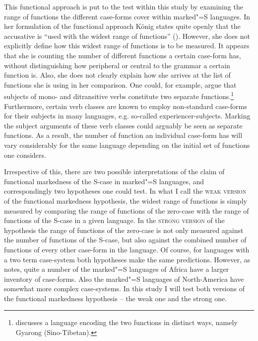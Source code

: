 This functional approach is put to the test within this study by examining the range of functions the different case-forms cover within marked"=S languages. 
In her formulation of the functional approach K\"onig states quite openly that the accusative is ``used with the widest range of functions'' (\citeyear[138]{Koenig:2008}). 
However, she does not explicitly define how this widest range of functions is to be measured. 
It appears that she is counting the number of different functions a certain case-form has, without distinguishing how peripheral or central to the grammar a certain function is. 
Also, she does not clearly explain how she arrives at the list of functions she is using in her comparison.  
One could, for example, argue that subjects of mono- and ditransitive verbs constitute two separate functions.\footnote{\citet[403]{Bickel.align} discusses a language encoding the two functions in distinct ways, namely Gyarong (Sino-Tibetan).}
Furthermore, certain verb classes are known to employ non-standard case-forms for their subjects in many languages, e.g. so-called experiencer-subjects. 
Marking the subject arguments of these verb classes could arguably be seen as separate functions.
As a result, the number of function an individual case-form has will vary considerably for the same language depending on the initial set of functions one considers.

Irrespective of this, there are two possible interpretations of the claim of functional markedness of the S-case in marked"=S languages, and correspondingly two hypotheses one could test. 
In what I call the \textsc{weak version} of the functional markedness hypothesis, the widest range of functions is simply measured by comparing the range of functions of the zero-case with the range of functions of the S-case in a given language. 
In the \textsc{strong version} of the hypothesis the range of functions of the zero-case is not only measured against the number of functions of the S-case, but also against the combined number of functions of every other case-form in the language. 
Of course, for languages with a two term case-system both hypotheses make the same predictions. 
However, as \citet{Koenig:2008} notes, quite a number of the marked"=S languages of Africa have a larger inventory of case-forms. 
Also the marked"=S languages of North-America have somewhat more complex case-systems.
In this study I will test both versions of the functional markedness hypothesis -- the weak one and the strong one. 

